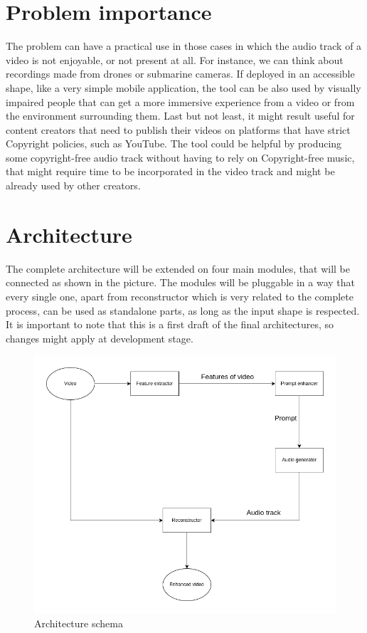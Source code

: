 \documentclass[conference]{IEEEtran}
\begin{document}
\section{Problem importance}
The problem can have a practical use in those cases in which the audio track of a video is not enjoyable, or not present at all. For instance, we can think about recordings made from drones or submarine cameras. If deployed in an accessible shape, like a very simple mobile application, the tool can be also used by visually impaired people that can get a more immersive experience from a video or from the environment surrounding them. 
Last but not least, it might result useful for content creators that need to publish their videos on platforms that have strict Copyright policies, such as YouTube. The tool could be helpful by producing some copyright-free audio track without having to rely on Copyright-free music, that might require time to be incorporated in the video track and might be already used by other creators.

\section{Architecture}
The complete architecture will be extended on four main modules, that will be connected as shown in the picture. The modules will be pluggable in a way that every single one, apart from reconstructor which is very related to the complete process, can be used as standalone parts, as long as the input shape is respected.\\
It is important to note that this is a first draft of the final architectures, so changes might apply at development stage.

\begin{figure}
\includegraphics[width=\linewidth]{architecture.drawio.png}
\caption{Architecture schema}
\end{figure}
\end{document}

